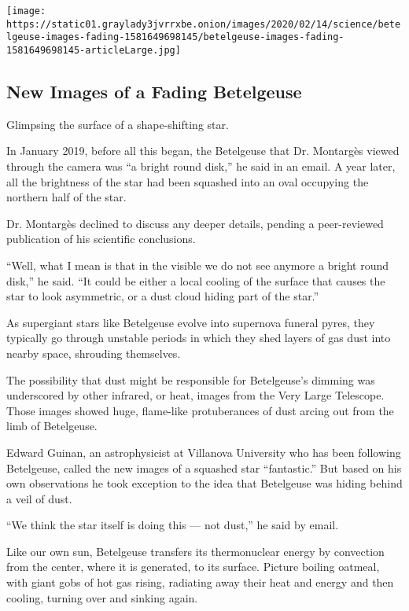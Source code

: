 \href{https://www.nytimes3xbfgragh.onion/interactive/2020/02/14/science/betelgeuse-images-fading.html}{}

\texttt{[image: https://static01.graylady3jvrrxbe.onion/images/2020/02/14/science/betelgeuse-images-fading-1581649698145/betelgeuse-images-fading-1581649698145-articleLarge.jpg]}

\hypertarget{new-images-of-a-fading-betelgeuse}{%
\subsection{New Images of a Fading
Betelgeuse}\label{new-images-of-a-fading-betelgeuse}}

Glimpsing the surface of a shape-shifting star.

In January 2019, before all this began, the Betelgeuse that Dr.
Montargès viewed through the camera was ``a bright round disk,'' he said
in an email. A year later, all the brightness of the star had been
squashed into an oval occupying the northern half of the star.

Dr. Montargès declined to discuss any deeper details, pending a
peer-reviewed publication of his scientific conclusions.

``Well, what I mean is that in the visible we do not see anymore a
bright round disk,'' he said. ``It could be either a local cooling of
the surface that causes the star to look asymmetric, or a dust cloud
hiding part of the star.''

As supergiant stars like Betelgeuse evolve into supernova funeral pyres,
they typically go through unstable periods in which they shed layers of
gas dust into nearby space, shrouding themselves.

The possibility that dust might be responsible for Betelgeuse's dimming
was underscored by other infrared, or heat, images from the Very Large
Telescope. Those images showed huge, flame-like protuberances of dust
arcing out from the limb of Betelgeuse.

Edward Guinan, an astrophysicist at Villanova University who has been
following Betelgeuse, called the new images of a squashed star
``fantastic.'' But based on his own observations he took exception to
the idea that Betelgeuse was hiding behind a veil of dust.

``We think the star itself is doing this --- not dust,'' he said by
email.

Like our own sun, Betelgeuse transfers its thermonuclear energy by
convection from the center, where it is generated, to its surface.
Picture boiling oatmeal, with giant gobs of hot gas rising, radiating
away their heat and energy and then cooling, turning over and sinking
again.

